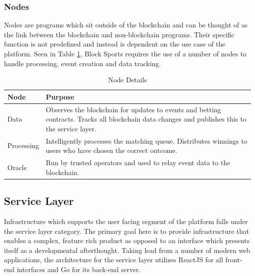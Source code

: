 \documentclass{article}
\begin{document}
		\subsubsection{Nodes}
Nodes are programs which sit outside of the blockchain and can be thought of as the link between the blockchain and non-blockchain programs. Their specific function is not predefined and instead is dependent on the use case of the platform. Seen in Table \ref{table:nodes}, Block Sports requires the use of a number of nodes to handle processing, event creation and data tracking.

\begin{table}[!htb]
\caption{Node Details}

\begin{tabularx}{\textwidth}{ p{3cm}  p{8.4cm}}
\bfseries{Node} & \bfseries{Purpose} \\
\hline

Data & Observes the blockchain for updates to events and betting contracts. \newline Tracks all blockchain data changes and publishes this to the service layer. \\
\hline

Processing & Intelligently processes the matching queue. \newline Distributes winnings to users who have chosen the correct outcome. \\   \hline

Oracle & Run by trusted operators and used to relay event data to the blockchain. \\

\hline

\end{tabularx}
\label{table:nodes}
\end{table}

	\subsection{Service Layer}
Infrastructure which supports the user facing segment of the platform falls under the service layer category. The primary goal here is to provide infrastructure that enables a complex, feature rich product as opposed to an interface which presents itself as a developmental afterthought. Taking lead from a number of modern web applications, the architecture for the service layer utilizes ReactJS for all front-end interfaces and Go for its back-end server.
\end{document}
